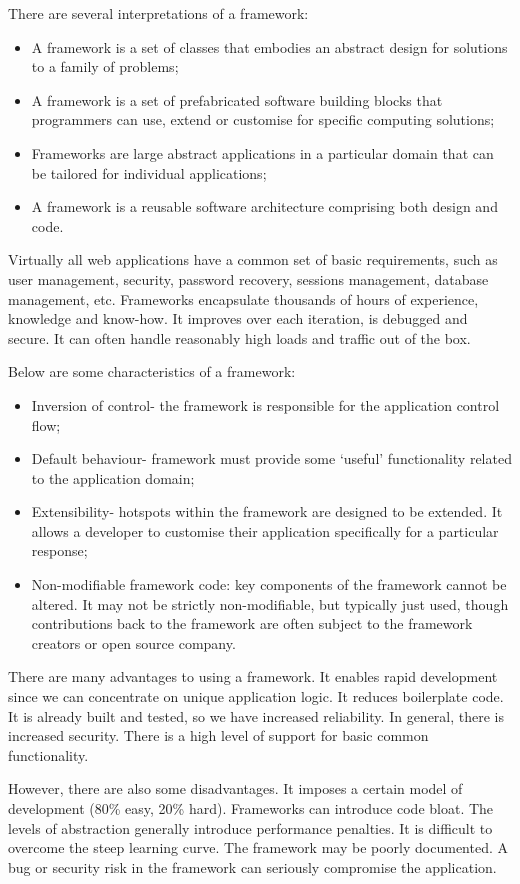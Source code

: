 \documentclass[a4paper, openany]{memoir}
\begin{document}
There are several interpretations of a framework:
\begin{itemize}
    \item A framework is a set of classes that embodies an abstract design for solutions to a family of problems;
    \item A framework is a set of prefabricated software building blocks that programmers can use, extend or customise for specific computing solutions;
    \item Frameworks are large abstract applications in a particular domain that can be tailored for individual applications;
    \item A framework is a reusable software architecture comprising both design and code.
\end{itemize}
Virtually all web applications have a common set of basic requirements, such as user management, security, password recovery, sessions management, database management, etc. Frameworks encapsulate thousands of hours of experience, knowledge and know-how. It improves over each iteration, is debugged and secure. It can often handle reasonably high loads and traffic out of the box.

Below are some characteristics of a framework:
\begin{itemize}
    \item Inversion of control- the framework is responsible for the application control flow;
    \item Default behaviour- framework must provide some `useful' functionality related to the application domain;
    \item Extensibility- hotspots within the framework are designed to be extended. It allows a developer to customise their application specifically for a particular response;
    \item Non-modifiable framework code: key components of the framework cannot be altered. It may not be strictly non-modifiable, but typically just used, though contributions back to the framework are often subject to the framework creators or open source company.
\end{itemize}
There are many advantages to using a framework. It enables rapid development since we can concentrate on unique application logic. It reduces boilerplate code. It is already built and tested, so we have increased reliability. In general, there is increased security. There is a high level of support for basic common functionality.

However, there are also some disadvantages. It imposes a certain model of development (80\% easy, 20\% hard). Frameworks can introduce code bloat. The levels of abstraction generally introduce performance penalties. It is difficult to overcome the steep learning curve. The framework may be poorly documented. A bug or security risk in the framework can seriously compromise the application.
\end{document}

